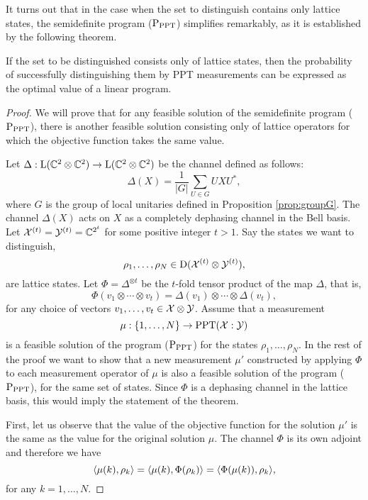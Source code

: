 It turns out that in the case when the set to distinguish contains only lattice states,
the semidefinite program ($\textup{P}_{\mathrm{PPT}}$) simplifies remarkably, as it is established 
by the following theorem.
\begin{theorem}
If the set to be distinguished consists only of lattice states, then the probability of 
successfully distinguishing them by PPT measurements can be expressed as the 
optimal value of a linear program.
\end{theorem}
\begin{proof}
We will prove that for any feasible solution of the semidefinite program ($\textup{P}_{\mathrm{PPT}}$), 
there is another feasible solution consisting only of lattice operators 
for which the objective function takes the same value.

Let $\Delta : \mathrm{L}(\mathbb{C}^{2}\otimes\mathbb{C}^{2}) \rightarrow 
  \mathrm{L}(\mathbb{C}^{2}\otimes\mathbb{C}^{2})$ be the channel defined as follows:
\begin{equation}
  \Delta(X) = \frac{1}{|G|}\sum_{U \in G} UXU^{*},
\end{equation}
where $G$ is the group of local unitaries defined in Proposition \ref{prop:groupG}. 
The channel $\Delta(X)$ acts on $X$ as a completely dephasing channel in the Bell basis.
Let $\mathcal{X}^{(t)} = \mathcal{Y}^{(t)} = \mathbb{C}^{2^{t}}$ for some positive integer $t > 1$. 
Say the states we want to distinguish,
\begin{equation}
  \rho_{1}, \ldots, \rho_{N} \in \mathrm{D}(\mathcal{X}^{(t)}\otimes\mathcal{Y}^{(t)}),
\end{equation}
are lattice states.
Let $\Phi = \Delta^{\otimes t}$ be the $t$-fold tensor product of the map $\Delta$,
that is,
\begin{equation}
  \Phi(v_{1}\otimes\cdots\otimes v_{t}) = 
    \Delta(v_{1})\otimes\cdots\otimes\Delta(v_{t}),
\end{equation}
for any choice of vectors $v_{1}, \ldots, v_{t} \in \mathcal{X}\otimes\mathcal{Y}$. 
Assume that a measurement 
\[
  \mu : \{1,\ldots,N\}\to\mathrm{PPT}(\mathcal{X}:\mathcal{Y})
\] 
is a feasible solution of the program ($\textup{P}_{\mathrm{PPT}}$) 
for the states $\rho_{1}, \ldots, \rho_{N}$. 
In the rest of the proof we want to show that a new measurement $\mu'$ constructed by 
applying $\Phi$ to each measurement operator of $\mu$ is also a feasible solution
of the program ($\textup{P}_{\mathrm{PPT}}$), for the same set of states.
Since $\Phi$ is a dephasing channel in the lattice basis, this would imply the 
statement of the theorem. 

First, let us observe that the value of the objective function for the solution 
$\mu'$ is the same as the value for the original solution $\mu$.
The channel $\Phi$ is its own adjoint and therefore we have
\[
  \langle \mu(k) , \rho_{k}\rangle = \langle \mu(k) , \Phi(\rho_{k})\rangle = 
  \langle \Phi(\mu(k)) , \rho_{k}\rangle ,
\]
for any $k = 1, \ldots, N$.


\end{proof}
